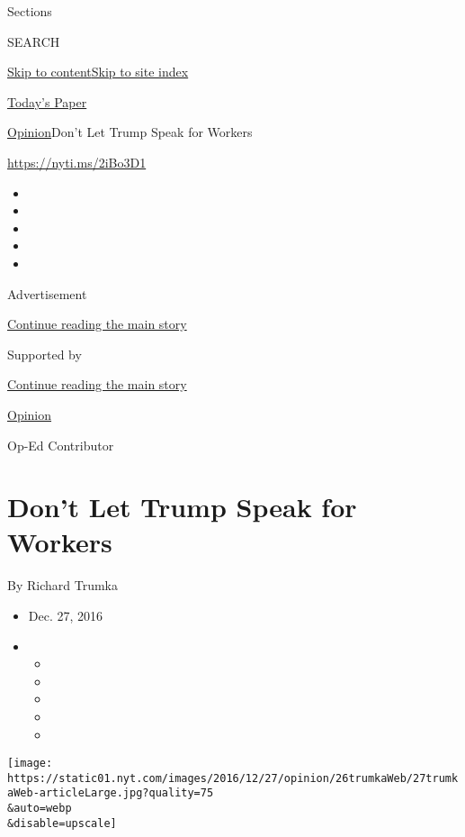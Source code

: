 Sections

SEARCH

\protect\hyperlink{site-content}{Skip to
content}\protect\hyperlink{site-index}{Skip to site index}

\href{https://myaccount.nytimes.com/auth/login?response_type=cookie\&client_id=vi}{}

\href{https://www.nytimes.com/section/todayspaper}{Today's Paper}

\href{/section/opinion}{Opinion}\textbar{}Don't Let Trump Speak for
Workers

\url{https://nyti.ms/2iBo3D1}

\begin{itemize}
\item
\item
\item
\item
\item
\end{itemize}

Advertisement

\protect\hyperlink{after-top}{Continue reading the main story}

Supported by

\protect\hyperlink{after-sponsor}{Continue reading the main story}

\href{/section/opinion}{Opinion}

Op-Ed Contributor

\hypertarget{dont-let-trump-speak-for-workers}{%
\section{Don't Let Trump Speak for
Workers}\label{dont-let-trump-speak-for-workers}}

By Richard Trumka

\begin{itemize}
\item
  Dec. 27, 2016
\item
  \begin{itemize}
  \item
  \item
  \item
  \item
  \item
  \end{itemize}
\end{itemize}

\texttt{[image: https://static01.nyt.com/images/2016/12/27/opinion/26trumkaWeb/27trumkaWeb-articleLarge.jpg?quality=75\\\&auto=webp\\\&disable=upscale]}


